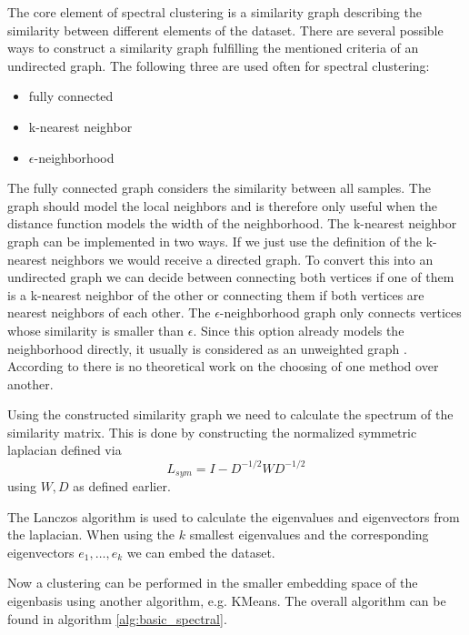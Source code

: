 The core element of spectral clustering is a similarity graph describing the similarity between different elements of the dataset.
There are several possible ways to construct a similarity graph fulfilling the mentioned criteria of an undirected graph.
The following three are used often for spectral clustering:
\begin{itemize}
  \item fully connected
  \item k-nearest neighbor
  \item \(\epsilon\)-neighborhood
\end{itemize}
The fully connected graph considers the similarity between all samples. The graph should model the local neighbors and is therefore only useful when the distance function
models the width of the neighborhood.
The k-nearest neighbor graph can be implemented in two ways. If we just use the definition of the k-nearest neighbors we would receive a directed graph.
To convert this into an undirected graph we can decide between connecting both vertices if one of them is a k-nearest neighbor of the other or connecting them if both vertices are nearest neighbors of each other.
The \(\epsilon\)-neighborhood graph only connects vertices whose similarity is smaller than \(\epsilon\).
Since this option already models the neighborhood directly, it usually is considered as an unweighted graph \cite{von_luxburg_tutorial_2007}.
According to \cite{von_luxburg_tutorial_2007} there is no theoretical work on the choosing of one method over
another.

Using the constructed similarity graph we need to calculate the spectrum of the similarity matrix.
This is done by constructing the normalized symmetric laplacian defined via
\[L_{sym} = I - D^{-1/2} W D^{-1/2}\]
using \(W, D\) as defined earlier.

The Lanczos algorithm \cite{lanczos_iteration_1950} is used to calculate the eigenvalues and eigenvectors from the laplacian.
When using the \(k\) smallest eigenvalues and the corresponding eigenvectors \(e_1, \ldots, e_k\) we can embed the dataset.

Now a clustering can be performed in the smaller embedding space of the eigenbasis using another algorithm, e.g. KMeans.
The overall algorithm can be found in algorithm \ref{alg:basic_spectral}.

